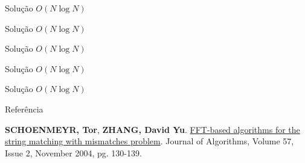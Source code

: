 \begin{frame}[fragile]{Solução $O(N\log N)$}
\end{frame}

\begin{frame}[fragile]{Solução $O(N\log N)$}
\end{frame}

\begin{frame}[fragile]{Solução $O(N\log N)$}
\end{frame}

\begin{frame}[fragile]{Solução $O(N\log N)$}
\end{frame}

\begin{frame}[fragile]{Solução $O(N\log N)$}
\end{frame}

\begin{frame}[fragile]{Referência}

    \textbf{SCHOENMEYR, Tor}, \textbf{ZHANG, David Yu}. \href{https://www.sciencedirect.com/science/article/pii/S0196677405000180}{FFT-based algorithms for the string matching with mismatches problem}. Journal of Algorithms, Volume 57, Issue 2, November 2004, pg. 130-139.
\end{frame}
